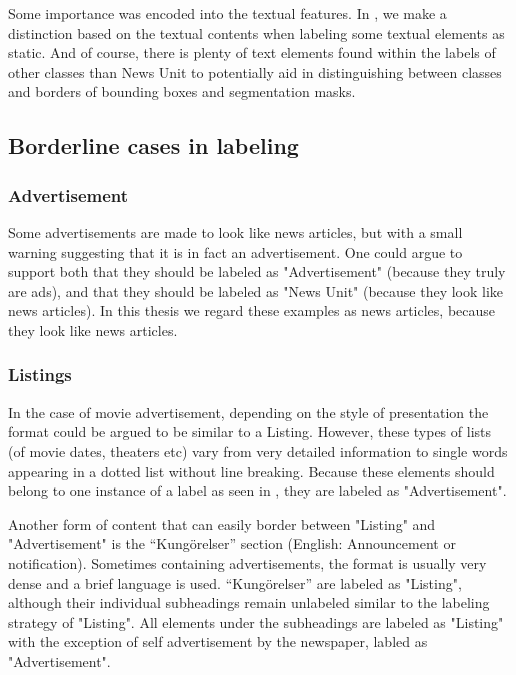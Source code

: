 \documentclass[oneside, english, bibtex]{kththesis}
\begin{document}
Some importance was encoded into the textual features. In , we make a distinction based on the textual contents when labeling some textual elements as static. And of course, there is plenty of text elements found within the labels of other classes than News Unit to potentially aid in distinguishing between classes and borders of bounding boxes and segmentation masks. 

\subsection{Borderline cases in labeling}

\subsubsection{Advertisement}
\label{subsub:ads}

Some advertisements are made to look like news articles, but with a small warning suggesting that it is in fact an advertisement. One could argue to support both that they should be labeled
as "Advertisement" (because they truly are ads), and that they should be labeled as "News Unit" (because they look like news articles). In this thesis we regard these examples as news articles, because they look like news articles. 

\subsubsection{Listings}
\label{subsub:listings}

In the case of movie advertisement, depending on the style of presentation the format could be argued to be similar to a Listing.
However, these types of lists (of movie dates, theaters etc) vary from very detailed information to single words appearing in a dotted list without line breaking.
Because these elements should belong to one instance of a label as seen in , they are labeled as "Advertisement".

Another form of content that can easily border between "Listing" and "Advertisement" is the “Kung\"orelser” section (English: Announcement or notification).
Sometimes containing advertisements, the format is usually very dense and a brief language is used.
“Kung\"orelser” are labeled as "Listing",
although their individual subheadings remain unlabeled similar to the labeling strategy of "Listing". All elements under the subheadings are labeled as "Listing" with the exception of self advertisement by the newspaper, labled as "Advertisement".
\end{document}
